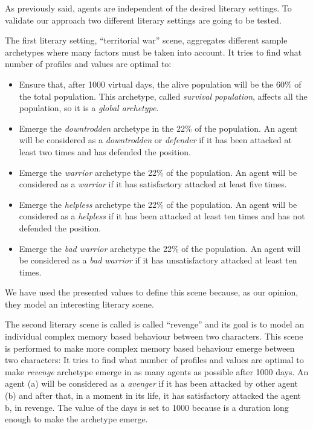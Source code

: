 \documentclass{sig-alternate}
\begin{document}
As previously said, agents are independent of the desired literary settings. To validate our approach two different literary settings are going to be tested.

The first literary setting, ``territorial war'' scene, aggregates different sample archetypes where many factors must be taken into account.  It tries to find what number of profiles and values are optimal to:
\begin{itemize}
\item Ensure that, after 1000 virtual days, the alive population will be the 60\% of the total population. This archetype, called \textit{survival population}, affects all the population, so it is a \textit{global archetype}.
\item Emerge the \textit{downtrodden} archetype in the 22\% of the
  population. An agent will be considered as a \textit{downtrodden} or
  \textit{defender} if it has been attacked at least two times and has
  defended the position.
\item Emerge the \textit{warrior} archetype the 22\% of the population. An agent will be considered as a \textit{warrior} if it has satisfactory attacked at least five times.
\item Emerge the \textit{helpless} archetype the 22\% of the population. An agent will be considered as a \textit{helpless}  if it has been attacked at least ten times and has not defended the position.
\item Emerge the \textit{bad warrior} archetype the 22\% of the population. An agent will be considered as a \textit{bad warrior}  if it has unsatisfactory attacked at least ten times.
\end{itemize}
We have used the presented values to define this scene because, as our opinion, they model an interesting literary scene.


The second literary scene is called is called ``revenge'' and its goal is to model an individual complex memory
based behaviour between two characters. This scene is performed to make more complex memory based behaviour emerge between two characters:  It tries to find what number of profiles and values are optimal to make \textit{revenge} archetype emerge in as many agents as possible after 1000 days.  An agent (a) will be considered as a \textit{avenger} if it has been attacked by other agent (b) and after that, in a moment in its life, it has satisfactory attacked the agent b, in revenge. The value of the days is set to 1000 because is a duration long enough to make the archetype emerge. 
\end{document}
